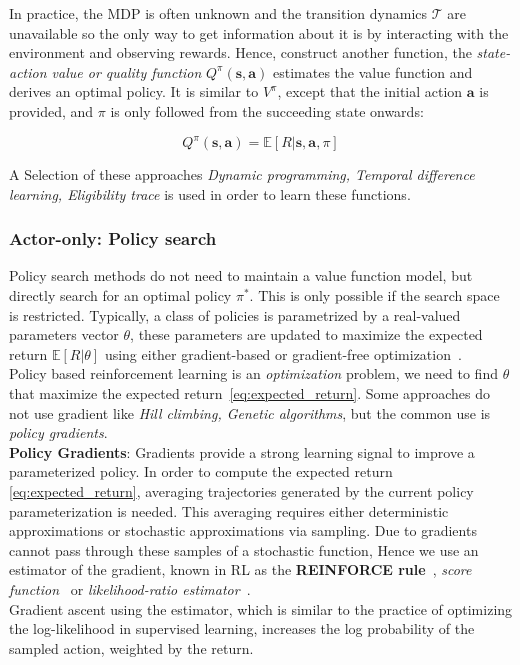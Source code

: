 In practice, the MDP is often unknown and the transition dynamics $\mathcal{T}$ are unavailable so the only way to get information about it is by interacting with the environment and observing rewards.
Hence, construct another function, the \textit{state-action value or quality function} $Q^{\pi}(\mathbf{s}, \mathbf{a})$ estimates the value function and derives an optimal policy. 
It is similar to $V^{\pi}$, except that the initial action $\mathbf{a}$ is provided, and $\pi$ is only followed from the succeeding state onwards:
\begin{center}
		\begin{equation}
				Q^{\pi}(\mathbf{s}, \mathbf{a})=\mathbb{E}[R | \mathbf{s}, \mathbf{a}, \pi]
		\end{equation}
\end{center}

A Selection of these approaches \textit{Dynamic programming, Temporal difference learning, 
Eligibility trace} is used in order to learn these functions.
\clearpage

\subsubsection{Actor-only: Policy search}

Policy search methods do not need to maintain a value function model, but directly search for an optimal policy $\pi^{*}$. This is only possible if the search space is restricted. Typically, a class of policies is parametrized by a real-valued parameters vector $\theta$, these parameters are updated to maximize the expected return $\mathbb{E}[R | \theta]$ using either gradient-based or gradient-free optimization~\parencite{deisenroth2013survey}.\\

Policy based reinforcement learning is an \textit{optimization} problem, we need to find $\theta$ that maximize the expected return~\eqref{eq:expected_return}.
Some approaches do not use gradient like \textit{Hill climbing, Genetic algorithms}, but the common use is \textit{policy gradients}.\\


\textbf{Policy Gradients}: Gradients provide a strong learning signal to improve a parameterized policy. In order to compute the expected return \eqref{eq:expected_return}, averaging trajectories generated by the current policy parameterization is needed. This averaging requires either deterministic approximations or stochastic approximations via sampling.
Due to gradients cannot pass through these samples of a stochastic function, 
Hence we use an estimator of the gradient, known in RL as the \textbf{REINFORCE rule}~\parencite{williams1992simple}, \textit{score function}~\parencite{fu2006gradient} or \textit{likelihood-ratio estimator}~\parencite{glynn1990likelihood}.\\
Gradient ascent using the estimator, which is similar to the practice of optimizing the log-likelihood in supervised learning, increases the log probability of the sampled action, weighted by the return.

